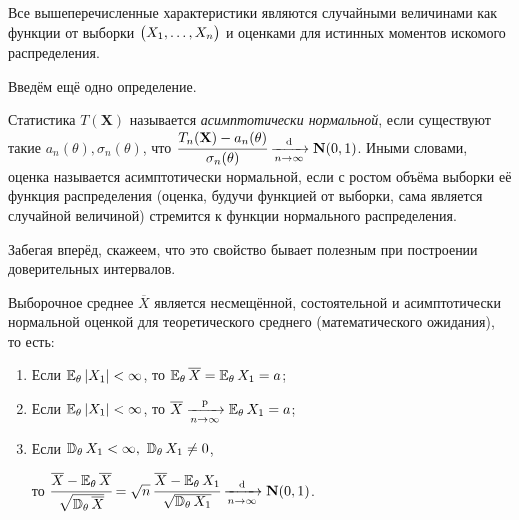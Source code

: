 Все вышеперечисленные характеристики являются случайными величинами как функции от выборки $\bigl( X_1, \ldots, X_n \bigr)$ и оценками для истинных моментов искомого распределения.

Введём ещё одно определение.
\begin{defn}
    Статистика $T(\mathbf{X})$ называется \textit{асимптотически нормальной}, если существуют такие 
    $a_n(\theta), \sigma_n(\theta)$, что $\cfrac{T_n(\mathbf{X}) - a_n(\theta)}{\sigma_n(\theta)} \xrightarrow[n \to \infty]{\text{d}} \mathbf{N}(0, 1)$.
    Иными словами, оценка называется асимптотически нормальной, если с ростом объёма выборки её функция распределения (оценка, будучи функцией от выборки, сама является случайной величиной) стремится к функции нормального распределения.
\end{defn}
Забегая вперёд, скажеем, что это свойство бывает полезным при построении доверительных интервалов.

\begin{thm*}
    Выборочное среднее $\overline{X}$ является несмещённой, состоятельной и асимптотически нормальной оценкой для теоретического среднего (математического ожидания), то есть:

    \begin{enumerate}[label={\arabic*.}]
        \item Если $\mathbb{E}_{\theta}\, |X_{1}|<\infty$, то $\mathbb{E}_{\theta}\, \overline{X} = \mathbb{E}_{\theta}\, X_{1}=a$;
        \item Если $\mathbb{E}_{\theta}\, |X_{1}|<\infty$, то $\overline{X} \xrightarrow[n \to \infty]{\text{p}} \mathbb{E}_{\theta}\, X_{1}=a$;
        \item Если $\mathbb{D}_{\theta}\,  X_{1}<\infty,~ \mathbb{D}_{\theta}\, X_{1} \neq 0$, 
        
        то $\cfrac{\overline{X} - \mathbb{E}_{\theta}\, \overline{X} }{\sqrt{\mathbb{D}_{\theta}\, \overline{X}}} = \sqrt{n} \,\cfrac{\overline{X} - \mathbb{E}_{\theta}\, X_1}{\sqrt{\mathbb{D}_{\theta}\, X_1}} \xrightarrow[n \to \infty]{\text{d}} \mathbf{N}(0, 1)$.
    \end{enumerate}
\end{thm*}

